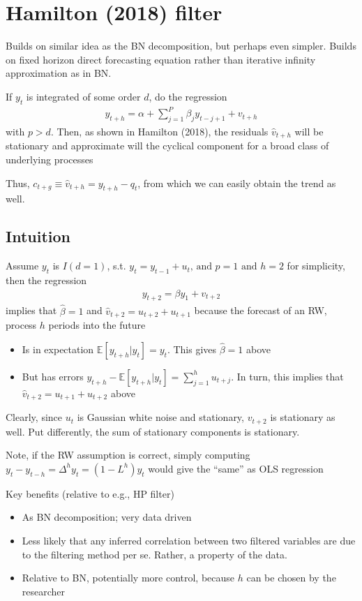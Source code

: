 \documentclass[10pt]{article}
\begin{document}
\section{Hamilton (2018) filter}
Builds on similar idea as the BN decomposition, but perhaps even simpler. Builds on fixed horizon direct forecasting equation rather than iterative infinity approximation as in BN. 

If $y_t $ is integrated of some order $d $, do the regression 
\begin{gather*}
    y_{t + h} = \alpha + \sum_{j = 1}^{P}\beta_jy_{t - j + 1}+ v_{t + h}
\end{gather*}
with $p > d $. Then, as shown in Hamilton (2018), the residuals $\hat{v}_{t + h} $ will be stationary and approximate will the cyclical component for a broad class of underlying processes

Thus, $c_{t + g}\equiv \hat{v}_{t + h} = y_{t + h} - q_t $, from which we can easily obtain the trend as well. 
\subsection{Intuition}
Assume $y_t $ is $I(d = 1) $, s.t. $y_t = y_{t - 1} + u_t \text{, and } p = 1 \text{ and } h = 2 $ for simplicity, then the regression 
\begin{gather*}
    y_{t + 2} = \beta y_1 + v_{t + 2}
\end{gather*}
implies that $\hat{\beta} = 1 $ and $\hat{v}_{t + 2} = u_{t + 2} + u_{t + 1} $ because the forecast of an RW, process $h $ periods into the future
\begin{itemize}
    \item Is in expectation $\mathbb{E}[y_{t + h}| y_t] = y_t $. This gives $\hat{\beta} = 1 $ above 
    \item But has errors $y_{t + h} - \mathbb{E}[y_{t + h}|y_t] = \sum_{j = 1}^{h}u_{t + j} $. In turn, this implies that $\hat{v}_{t + 2} = u_{t + 1} + u_{t + 2} $ above 
\end{itemize}
Clearly, since $u_t $ is Gaussian white noise and stationary, $v_{t + 2} $ is stationary as well. Put differently, the sum of stationary components is stationary. 

Note, if the RW assumption is correct, simply computing $y_t - y_{t - h} = \Delta^hy_t = \left(1 - L^h\right)y_t $ would give the ``same'' as OLS regression 

Key benefits (relative to e.g., HP filter)
\begin{itemize}
    \item As BN decomposition; very data driven
    \item Less likely that any inferred correlation between two filtered variables are due to the filtering method per se. Rather, a property of the data. 
    \item Relative to BN, potentially more control, because $h $ can be chosen by the researcher
\end{itemize}
\end{document}
